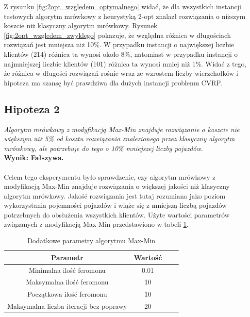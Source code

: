 \documentclass{article}
\begin{document}
\noindent Z rysunku \ref{fig:2opt_wzgledem_optymalnego} widać, że dla wszystkich instancji testowych algorytm mrówkowy z heurystyką 2-opt znalazł rozwiązania o niższym koszcie niż klasyczny algorytm mrówkowy. Rysunek \ref{fig:2opt_wzgledem_zwyklego} pokazuje, że względna różnica w długościach rozwiązań jest mniejsza niż 10\%. W przypadku instancji o największej liczbie klientów (214) różnica ta wynosi około 8\%, natomiast w przypadku instancji o najmniejszej liczbie klientów (101) różnica ta wynosi mniej niż 1\%. Widać z tego, że różnica w długości rozwiązań rośnie wraz ze wzrostem liczby wierzchołków i hipoteza ma szansę być prawdziwa dla dużych instancji problemu CVRP.

\subsection{Hipoteza 2}
\textit{Algorytm mrówkowy z modyfikacją Max-Min znajduje rozwiązanie o koszcie nie większym niż 5\% od kosztu rozwiązania znalezionego przez klasyczny algorytm mrówkowy, ale potrzebuje do tego o 10\% mniejszej liczby pojazdów.}
\\
\textbf{Wynik: Fałszywa.}
\\ \\
\noindent Celem tego eksperymentu było sprawdzenie, czy algorytm mrówkowy z modyfikacją Max-Min znajduje rozwiązania o większej jakości niż klasyczny algorytm mrówkowy. Jakość rozwiązania jest tutaj rozumiana jako poziom wykorzystania pojemności pojazdów i wiąże się z mniejszą liczbą pojazdów potrzebnych do obsłużenia wszystkich klientów. Użyte wartości parametrów związanych z modyfikacją Max-Min przedstawiono w tabeli \ref{tab:maxmin_params}.

\begin{table}[H]
    \centering
    \begin{tabular}{|c|c|c|c|}
        \hline
        \textbf{Parametr} & \textbf{Wartość} \\
        \hline
        Minimalna ilość feromonu & 0.01 \\
        \hline
        Maksymalna ilość feromonu & 10 \\
        \hline
        Początkowa ilość feromonu & 10 \\
        \hline
        Maksymalna liczba iteracji bez poprawy & 20 \\
        \hline
    \end{tabular}
    \caption{Dodatkowe parametry algorytmu Max-Min}
    \label{tab:maxmin_params}
\end{table}
\end{document}
